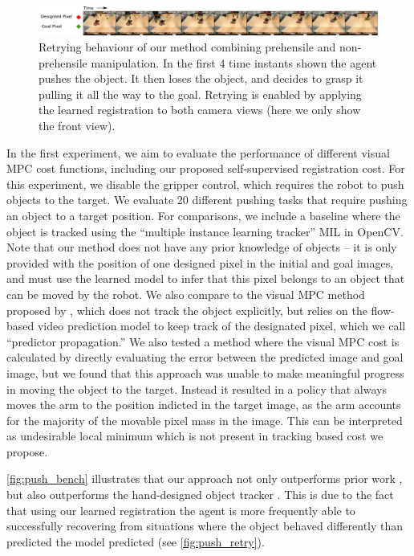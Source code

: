 \begin{figure}
    \centering
    \includegraphics[width=1.0\textwidth]{images_rfr/pick_place_plush.pdf}
    \caption{\small{Retrying behaviour of our method combining prehensile and non-prehensile manipulation. In the first 4 time instants shown the agent pushes the object. It then loses the object, and decides to grasp it pulling it all the way to the goal. Retrying is enabled by applying the learned registration to both camera views (here we only show the front view).}}
    \label{fig:discrete}
\end{figure}

In the first experiment, we aim to evaluate the performance of different visual MPC cost functions, including our proposed self-supervised registration cost. For this experiment, we disable the gripper control, which requires the robot to push objects to the target. We evaluate 20 different pushing tasks that require pushing an object to a target position. For comparisons, we include a baseline where the object is tracked using the ``multiple instance learning tracker'' MIL \cite{babenko2009visual} in OpenCV. Note that our method does not have any prior knowledge of objects -- it is only provided with the position of one designed pixel in the initial and goal images, and must use the learned model to infer that this pixel belongs to an object that can be moved by the robot. We also compare to the visual MPC method proposed by \citet{sna},
which does not track the object explicitly, but relies on the flow-based video prediction model to keep track of the designated pixel, which we call ``predictor propagation.'' We also tested a method where the visual MPC cost is calculated by directly evaluating the error between the predicted image and goal image, but we found that this approach was unable to make meaningful progress in moving the object to the target. Instead it resulted in a policy that always moves the arm to the position indicted in the target image, as the arm accounts for the majority of the movable pixel mass in the image. This can be interpreted as undesirable local minimum which is not present in tracking based cost we propose.

\autoref{fig:push_bench} illustrates that our approach not only outperforms prior work \cite{sna}, but also outperforms the hand-designed object tracker \cite{babenko2009visual}. This is due to the fact that using our learned registration the agent is more frequently able to successfully recovering from situations where the object behaved differently than predicted the model predicted (see \autoref{fig:push_retry}).

